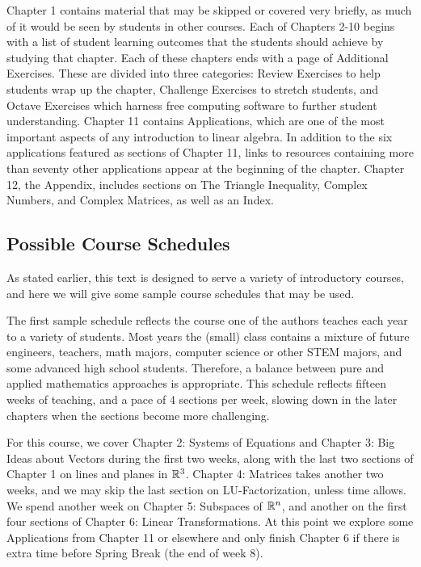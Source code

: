 \documentclass{ximera}
\begin{document}
Chapter 1 contains material that may be skipped or covered very briefly, as much of it would be seen by students in other courses.  Each of Chapters 2-10 begins with a list of student learning outcomes that the students should achieve by studying that chapter.  Each of these chapters ends with a page of Additional Exercises.  These are divided into three categories: Review Exercises to help students wrap up the chapter, Challenge Exercises to stretch students, and Octave Exercises which harness free computing software to further student understanding.  Chapter 11 contains Applications, which are one of the most important aspects of any introduction to linear algebra.  In addition to the six applications featured as sections of Chapter 11, links to resources containing more than seventy other applications appear at the beginning of the chapter.  Chapter 12, the Appendix, includes sections on The Triangle Inequality, Complex Numbers, and Complex Matrices, as well as an Index.


\subsection{Possible Course Schedules}

As stated earlier, this text is designed to serve a variety of introductory courses, and here we will give some sample course schedules that may be used.

The first sample schedule reflects the course one of the authors teaches each year to a variety of students.  Most years the (small) class contains a mixture of future engineers, teachers, math majors, computer science or other STEM majors, and some advanced high school students.  Therefore, a balance between pure and applied mathematics approaches is appropriate.  This schedule reflects fifteen weeks of teaching, and a pace of 4 sections per week, slowing down in the later chapters when the sections become more challenging.  

For this course, we cover Chapter 2: Systems of Equations and Chapter 3: Big Ideas about Vectors during the first two weeks, along with the last two sections of Chapter 1 on lines and planes in $\mathbb{R}^3$.  Chapter 4: Matrices takes another two weeks, and we may skip the last section on LU-Factorization, unless time allows.  We spend another week on Chapter 5: Subspaces of $\mathbb{R}^n$, and another on the first four sections of Chapter 6: Linear Transformations.  At this point we explore some Applications from Chapter 11 or elsewhere and only finish Chapter 6 if there is extra time before Spring Break (the end of week 8).
\end{document}
